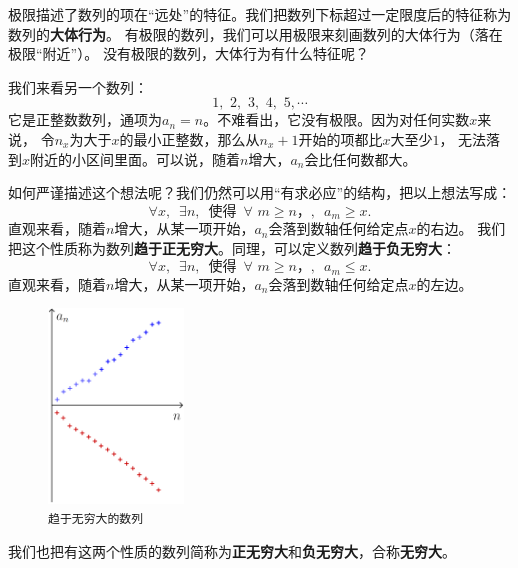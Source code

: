 \documentclass[12pt,UTF8]{ctexbook}
\begin{document}
极限描述了数列的项在“远处”的特征。我们把数列下标超过一定限度后的特征称为数列的\textbf{大体行为}。
有极限的数列，我们可以用极限来刻画数列的大体行为（落在极限“附近”）。
没有极限的数列，大体行为有什么特征呢？

我们来看另一个数列：
$$ 1,\,\,2,\,\,3,\,\,4,\,\,5,\cdots $$
它是正整数数列，通项为$a_n = n$。不难看出，它没有极限。因为对任何实数$x$来说，
令$n_x$为大于$x$的最小正整数，那么从$n_x+1$开始的项都比$x$大至少$1$，
无法落到$x$附近的小区间里面。可以说，随着$n$增大，$a_n$会比任何数都大。

如何严谨描述这个想法呢？我们仍然可以用“有求必应”的结构，把以上想法写成：
$$ \forall x, \,\,\, \exists n, \,\,\,\mbox{使得} \,\,\,\forall \,\, m \geqslant n，,\,\,\, a_m \geqslant x.$$
直观来看，随着$n$增大，从某一项开始，$a_n$会落到数轴任何给定点$x$的右边。
我们把这个性质称为数列\textbf{趋于正无穷大}。同理，可以定义数列\textbf{趋于负无穷大}：
$$\forall x, \,\,\, \exists n, \,\,\,\mbox{使得}\,\,\,\forall \,\, m \geqslant n，,\,\,\, a_m \leqslant x.$$
直观来看，随着$n$增大，从某一项开始，$a_n$会落到数轴任何给定点$x$的左边。

\begin{figure} %
    \vspace{-48pt}
    \flushright
    \includegraphics[width=0.32\textwidth]{数列无穷大1.png}
    \caption*{\texttt{趋于无穷大的数列}}
\end{figure}

我们也把有这两个性质的数列简称为\textbf{正无穷大}和\textbf{负无穷大}，合称\textbf{无穷大}。
\end{document}
